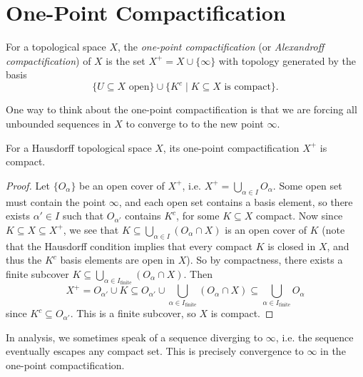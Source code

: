 \section{One-Point Compactification}
\begin{definition}
  For a topological space $X$, the \emph{one-point compactification}
  (or \emph{Alexandroff compactification}) of $X$ is
  the set $X^+ = X \cup \{\infty\}$ with topology
  generated by the basis
  \[
    \{\text{$U \subseteq X$ open}\}
    \cup \{K^c \mid K \subseteq X \text{ is compact}\}
  .\]
\end{definition}

\begin{remark}
  One way to think about the
  one-point compactification is that we are forcing
  all unbounded sequences in $X$ to converge to
  to the new point $\infty$.
\end{remark}

\begin{theorem}
  For a Hausdorff topological space $X$, its
  one-point compactification $X^+$ is compact.
\end{theorem}

\begin{proof}
  Let $\{O_\alpha\}$ be an open cover of $X^+$, i.e.
  $X^+ = \bigcup_{\alpha \in I} O_\alpha$. Some
  open set must contain the point $\infty$, and
  each open set contains a basis element, so
  there exists $\alpha' \in I$ such that
  $O_{\alpha'}$ contains $K^c$, for some
  $K \subseteq X$ compact. Now since $K \subseteq X \subseteq X^+$,
  we see that $K \subseteq \bigcup_{\alpha \in I} (O_\alpha \cap X)$ is an open cover of $K$ (note that the Hausdorff
  condition implies that every compact $K$ is closed
  in $X$, and thus the $K^c$ basis elements are open in $X$).
  So by compactness, there exists a finite subcover
  $K \subseteq \bigcup_{\alpha \in I_{\text{finite}}} (O_{\alpha} \cap X)$.
  Then
  \[
    X^+ = O_{\alpha'} \cup K
    \subseteq O_{\alpha'} \cup \bigcup_{\alpha \in I_{\text{finite}}} (O_{\alpha} \cap X)
    \subseteq \bigcup_{\alpha \in I_{\text{finite}}} O_{\alpha}
  \]
  since $K^c \subseteq O_{\alpha'}$. This is a
  finite subcover, so $X$ is compact.
\end{proof}

\begin{remark}
  In analysis, we sometimes speak of a sequence
  diverging to $\infty$, i.e. the sequence
  eventually escapes any compact set. This is precisely
  convergence to $\infty$ in the one-point
  compactification.
\end{remark}


